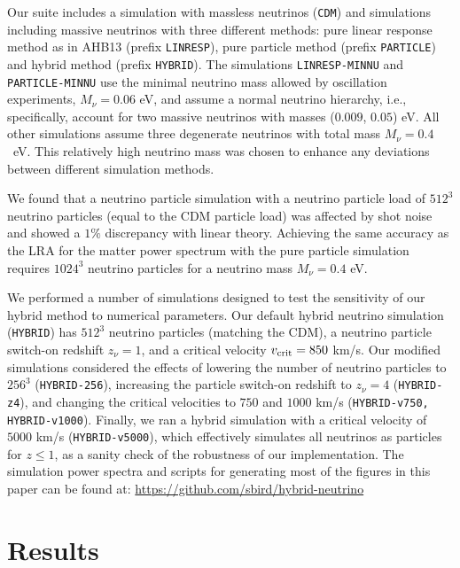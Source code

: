 \documentclass[useAMS, usenatbib]{mnras}
\begin{document}
Our suite includes a simulation with massless neutrinos (\texttt{CDM}) and simulations including massive neutrinos with three different methods: pure linear response method as in AHB13 (prefix \texttt{LINRESP}), pure particle method (prefix \texttt{PARTICLE}) and hybrid method (prefix \texttt{HYBRID}). The simulations \texttt{LINRESP-MINNU} and \texttt{PARTICLE-MINNU} use the minimal neutrino mass allowed by oscillation experiments, $M_\nu = 0.06$ eV, and assume a normal neutrino hierarchy, i.e., specifically, account for two massive neutrinos with masses ($0.009$, $0.05$) eV. All other simulations assume three degenerate neutrinos with total mass $M_\nu = 0.4$~eV. This relatively high neutrino mass was chosen to enhance any deviations between different simulation methods.

We found that a neutrino particle simulation with a neutrino particle load of $512^3$ neutrino particles (equal to the CDM particle load) was affected by shot noise and showed a $1\%$ discrepancy with linear theory. Achieving the same accuracy as the LRA for the matter power spectrum with the pure particle simulation requires $1024^3$ neutrino particles for a neutrino mass $M_\nu = 0.4$ eV.

We performed a number of simulations designed to test the sensitivity of our hybrid method to numerical parameters. Our default hybrid neutrino simulation (\texttt{HYBRID}) has $512^3$ neutrino particles (matching the CDM), a neutrino particle switch-on redshift $z_\nu = 1$, and a critical velocity $v_{\rm crit} = 850$ km/s. Our modified simulations considered the effects of lowering the number of neutrino particles to $256^3$ (\texttt{HYBRID-256}), increasing the particle switch-on redshift to $z_\nu = 4$ (\texttt{HYBRID-z4}), and changing the critical velocities to $750$ and $1000$ km/s (\texttt{HYBRID-v750, HYBRID-v1000}). Finally, we ran a hybrid simulation with a critical velocity of $5000$ km/s (\texttt{HYBRID-v5000}), which effectively simulates all neutrinos as particles for $z \leq 1$, as a sanity check of the robustness of our implementation.  The simulation power spectra and scripts for generating most of the figures in this paper can be found at: \url{https://github.com/sbird/hybrid-neutrino}

\section{Results}
\label{sec:results}
\end{document}
